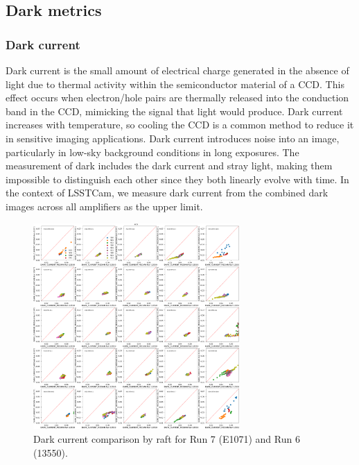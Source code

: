 \subsection{Dark metrics}\label{dark-metrics}

\subsubsection{Dark current}\label{dark-current}

Dark current is the small amount of electrical charge generated in the
absence of light due to thermal activity within the semiconductor
material of a CCD. This effect occurs when electron/hole pairs are thermally released
into the conduction band in the CCD, mimicking the signal that light would
produce. Dark current increases with temperature, so cooling the CCD is
a common method to reduce it in sensitive imaging applications. Dark
current introduces noise into an image, particularly in low-sky background conditions in long exposures.
The measurement of dark includes the dark current and stray light, making them impossible to distinguish each other since they both linearly evolve with time.
In the context
of LSSTCam, we measure dark current from the combined dark images across
all amplifiers as the upper limit.

\begin{figure}[H]
\begin{centering}
\includegraphics[width=0.7\textwidth]{figures/baselineCharacterization/13550_E1071_DARK_CURRENT_MEDIAN_inset.png}
\caption{Dark current comparison by raft for Run 7 (E1071) and Run 6 (13550).}
\label{fig:dark}
\end{centering}
\end{figure}

